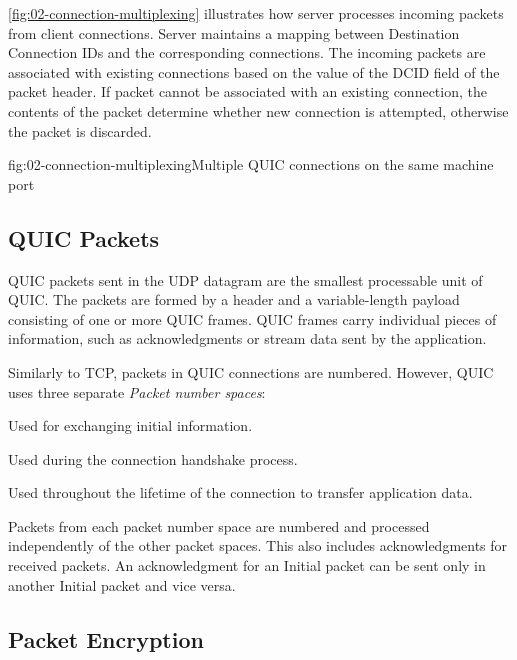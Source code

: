 \autoref{fig:02-connection-multiplexing} illustrates how server processes incoming packets from
client connections. Server maintains a mapping between Destination Connection IDs and the
corresponding connections. The incoming packets are associated with existing connections based on
the value of the DCID field of the packet header. If packet cannot be associated with an existing
connection, the contents of the packet determine whether new connection is attempted, otherwise the
packet is discarded.

\begin{myFigure}{fig:02-connection-multiplexing}{Multiple QUIC connections on the same machine port}



\end{myFigure}

\subsection{QUIC Packets}

QUIC packets sent in the UDP datagram are the smallest processable unit of QUIC\@. The packets are
formed by a header and a variable-length payload consisting of one or more QUIC frames. QUIC frames
carry individual pieces of information, such as acknowledgments or stream data sent by the
application.

Similarly to TCP, packets in QUIC connections are numbered. However, QUIC uses three separate
\textit{Packet number spaces}:

\begin{enumerate}

   Used for exchanging initial information.

   Used during the connection handshake process.

   Used throughout the lifetime of the connection to transfer application data.

\end{enumerate}

Packets from each packet number space are numbered and processed independently of the other packet
spaces. This also includes acknowledgments for received packets. An acknowledgment for an Initial
packet can be sent only in another Initial packet and vice versa.

\subsection{Packet Encryption}

